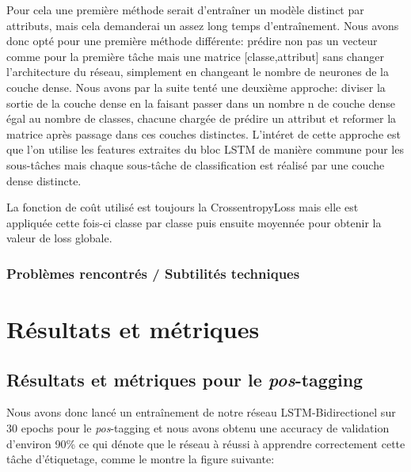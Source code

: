 \documentclass[a4paper]{article}
\begin{document}
Pour cela une première méthode serait d'entraîner un modèle distinct par attributs, mais cela demanderai un 
assez long temps d'entraînement. Nous avons donc opté pour une première méthode différente: prédire non pas un 
vecteur comme pour la première tâche mais une matrice [classe,attribut] sans changer l'architecture du réseau, 
simplement en changeant le nombre de neurones de la couche dense. Nous avons par la suite tenté une deuxième 
approche: diviser la sortie de la couche dense en la faisant passer dans un nombre n de couche dense égal au 
nombre de classes, chacune chargée de prédire un attribut et reformer la matrice après passage dans ces couches 
distinctes. L'intéret de cette approche est que l'on utilise les features extraites du bloc LSTM de manière 
commune pour les sous-tâches mais chaque sous-tâche de classification est réalisé par une couche dense distincte.

La fonction de coût utilisé est toujours la CrossentropyLoss mais elle est appliquée cette fois-ci classe par 
classe puis ensuite moyennée pour obtenir la valeur de loss globale.

\subsubsection{Problèmes rencontrés / Subtilités techniques}



\section{Résultats et métriques}


\subsection{Résultats et métriques pour le \textit{pos}-tagging}
Nous avons donc lancé un entraînement de notre réseau LSTM-Bidirectionel sur 30 epochs pour le \textit{pos}-tagging et 
nous avons obtenu une accuracy de validation d'environ 90\% ce qui dénote que le réseau à réussi à apprendre 
correctement cette tâche d'étiquetage, comme le montre la figure suivante:
\end{document}
